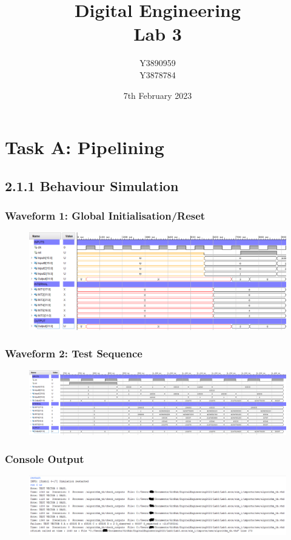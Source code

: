 \documentclass[11pt]{report}
\title{Digital Engineering\\Lab 3}
\author{Y3890959\\Y3878784}
\date{7th February 2023}
\begin{document}
\maketitle

\chapter*{Task A: Pipelining}

\section*{2.1.1 Behaviour Simulation}
\subsection*{Waveform 1: Global Initialisation/Reset}
\begin{figure}[H]
    \includegraphics[width=\columnwidth]{Assets/2.1.1_waveform-initial-reset.png}
\end{figure}

\subsection*{Waveform 2: Test Sequence}
\begin{figure}[H]
    \includegraphics[width=\columnwidth]{Assets/2.1.1_waveform-test-sequence.png}
\end{figure}

\subsection*{Console Output}
\begin{figure}[H]
    \includegraphics[width=\columnwidth]{Assets/2.1.1_console.png}
\end{figure}
\end{document}
